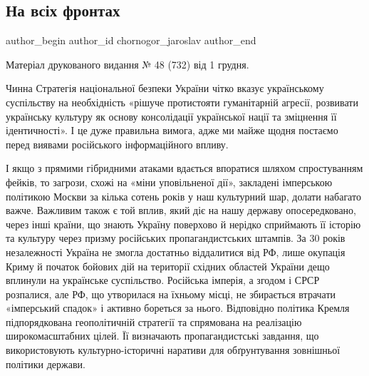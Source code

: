  
 
 
 
 
\subsection{На всіх фронтах}
\label{sec:06_12_2021.stz.news.ua.tyzhden.1.na_vsih_frontah}

\ifcmt
 author_begin
   author_id chornogor_jaroslav
 author_end
\fi



Матеріал друкованого видання № 48 (732) від 1 грудня.


Чинна Стратегія національної безпеки України чітко вказує українському
суспільству на необхідність «рішуче протистояти гуманітарній агресії, розвивати
українську культуру як основу консолідації української нації та зміцнення її
ідентичності». І це дуже правильна вимога, адже ми майже щодня постаємо перед
виявами російського інформаційного впливу. 


І якщо з прямими гібридними атаками вдається впоратися шляхом спростуванням
фейків, то загрози, схожі на «міни уповільненої дії», закладені імперською
політикою Москви за кілька сотень років у наш культурний шар, долати набагато
важче. Важливим також є той вплив, який діє на нашу державу опосередковано,
через інші країни, що знають Україну поверхово й нерідко сприймають її історію
та культуру через призму російських пропагандистських штампів. За 30 років
незалежності Україна не змогла достатньо віддалитися від РФ, лише окупація
Криму й початок бойових дій на території східних областей України дещо вплинули
на українське суспільство. Російська імперія, а згодом і СРСР розпалися, але
РФ, що утворилася на їхньому місці, не збирається втрачати «імперський спадок»
і активно бореться за нього. Відповідно політика Кремля підпорядкована
геополітичній стратегії та спрямована на реалізацію широкомасштабних цілей. Її
визначають пропагандистські завдання, що використовують культурно-історичні
наративи для обґрунтування зовнішньої політики держави.

